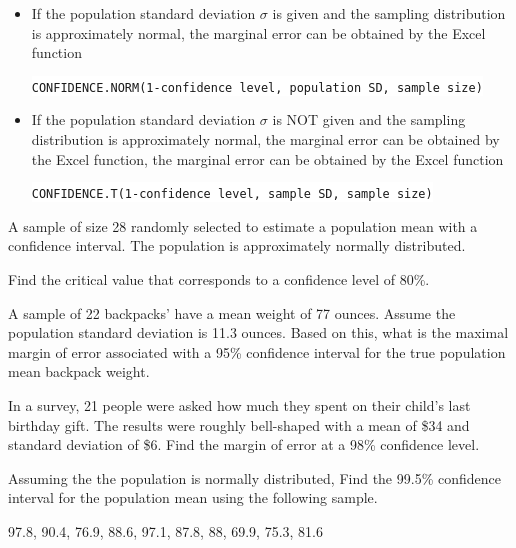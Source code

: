 \begin{itemize}
\item
  If the population standard deviation \(\sigma\) is given and the
  sampling distribution is approximately normal, the marginal error can be obtained by the Excel function\\
  \begin{fullwidth}
    \colorbox{white}{
      \texttt{CONFIDENCE.NORM(1-confidence\ level,\ population\ SD,\ sample\ size)}
    }
  \end{fullwidth}
\item
  If the population standard deviation \(\sigma\) is NOT given and the
  sampling distribution is approximately normal, the marginal error can
  be obtained by the Excel function, the marginal error can be obtained by the Excel function

  \begin{fullwidth}
    \colorbox{white}{
      \texttt{CONFIDENCE.T(1-confidence\ level,\ sample\ SD,\ sample\ size)}
    }
  \end{fullwidth}
\end{itemize}

\begin{exercise}

A sample of size 28 randomly selected to estimate a population mean with
a confidence interval. The population is approximately normally
distributed.

Find the critical value that corresponds to a confidence level of 80\%.

\end{exercise}
\vspace*{6\baselineskip}

\begin{exercise}

A sample of 22 backpacks' have a mean weight of 77 ounces. Assume the
population standard deviation is 11.3 ounces. Based on this, what is the
maximal margin of error associated with a 95\% confidence interval for
the true population mean backpack weight.

\end{exercise}
\vspace*{6\baselineskip}

\begin{exercise}

In a survey, 21 people were asked how much they spent on their child's
last birthday gift. The results were roughly bell-shaped with a mean of
\$34 and standard deviation of \$6. Find the margin of error at a 98\%
confidence level.

\end{exercise}
\vspace*{6\baselineskip}

\begin{exercise}

Assuming the the population is normally distributed, Find the 99.5\%
confidence interval for the population mean using the following sample.

97.8, 90.4, 76.9, 88.6, 97.1, 87.8, 88, 69.9, 75.3, 81.6

\end{exercise}
\vspace*{6\baselineskip}

